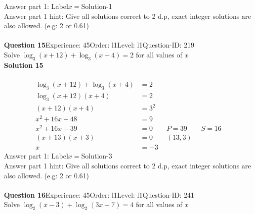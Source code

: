 \documentclass{article}
\begin{document}
Answer part 1: \hspace{10pt}Label\hspace{10pt}$x=$\hspace{10pt}Solution\hspace{10pt}-1\\
Answer part 1 hint: \hspace{15pt}Give all solutions correct to 2 d.p, exact integer solutions are also allowed. (e.g: 2 or 0.61)\\
\\[4pt]
\noindent\textbf{Question 15}\hspace{20pt}Experience: 45\hspace{20pt}Order: l1\hspace{20pt}Level: l1\hspace{20pt}Question-ID: 219\\[2pt]
Solve $\log_{3}(x+12)+\log_{3}(x+4)=2$ for all values of $x$\\[4pt]
\noindent\textbf{Solution 15}\\[2pt]
\\[-35pt]\begin{align*}
\log_{3}(x+12)+\log_{3}(x+4)&=2\\[2pt]
\log_{3}(x+12)(x+4)&=2\\[2pt]
(x+12)(x+4)&=3^2\\[2pt]
x^2+16x+48&=9\\[2pt]
x^2+16x+39&=0\qquad P=39 \qquad S=16\\[2pt]
(x+13)(x+3)&=0\qquad (13,3)\\[2pt]
x&=-3
\end{align*}
Answer part 1: \hspace{10pt}Label\hspace{10pt}$x=$\hspace{10pt}Solution\hspace{10pt}-3\\
Answer part 1 hint: \hspace{15pt} Give all solutions correct to 2 d.p, exact integer solutions are also allowed. (e.g: 2 or 0.61)\\
\\[4pt]
\noindent\textbf{Question 16}\hspace{20pt}Experience: 45\hspace{20pt}Order: l1\hspace{20pt}Level: l1\hspace{20pt}Question-ID: 241\\[2pt]
Solve $\log_{2}(x-3)+\log_{2}(3x-7)=4$ for all values of $x$\\[4pt]
\end{document}
